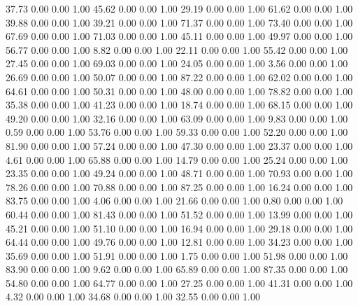    37.73   0.00   0.00   1.00
   45.62   0.00   0.00   1.00
   29.19   0.00   0.00   1.00
   61.62   0.00   0.00   1.00
   39.88   0.00   0.00   1.00
   39.21   0.00   0.00   1.00
   71.37   0.00   0.00   1.00
   73.40   0.00   0.00   1.00
   67.69   0.00   0.00   1.00
   71.03   0.00   0.00   1.00
   45.11   0.00   0.00   1.00
   49.97   0.00   0.00   1.00
   56.77   0.00   0.00   1.00
    8.82   0.00   0.00   1.00
   22.11   0.00   0.00   1.00
   55.42   0.00   0.00   1.00
   27.45   0.00   0.00   1.00
   69.03   0.00   0.00   1.00
   24.05   0.00   0.00   1.00
    3.56   0.00   0.00   1.00
   26.69   0.00   0.00   1.00
   50.07   0.00   0.00   1.00
   87.22   0.00   0.00   1.00
   62.02   0.00   0.00   1.00
   64.61   0.00   0.00   1.00
   50.31   0.00   0.00   1.00
   48.00   0.00   0.00   1.00
   78.82   0.00   0.00   1.00
   35.38   0.00   0.00   1.00
   41.23   0.00   0.00   1.00
   18.74   0.00   0.00   1.00
   68.15   0.00   0.00   1.00
   49.20   0.00   0.00   1.00
   32.16   0.00   0.00   1.00
   63.09   0.00   0.00   1.00
    9.83   0.00   0.00   1.00
    0.59   0.00   0.00   1.00
   53.76   0.00   0.00   1.00
   59.33   0.00   0.00   1.00
   52.20   0.00   0.00   1.00
   81.90   0.00   0.00   1.00
   57.24   0.00   0.00   1.00
   47.30   0.00   0.00   1.00
   23.37   0.00   0.00   1.00
    4.61   0.00   0.00   1.00
   65.88   0.00   0.00   1.00
   14.79   0.00   0.00   1.00
   25.24   0.00   0.00   1.00
   23.35   0.00   0.00   1.00
   49.24   0.00   0.00   1.00
   48.71   0.00   0.00   1.00
   70.93   0.00   0.00   1.00
   78.26   0.00   0.00   1.00
   70.88   0.00   0.00   1.00
   87.25   0.00   0.00   1.00
   16.24   0.00   0.00   1.00
   83.75   0.00   0.00   1.00
    4.06   0.00   0.00   1.00
   21.66   0.00   0.00   1.00
    0.80   0.00   0.00   1.00
   60.44   0.00   0.00   1.00
   81.43   0.00   0.00   1.00
   51.52   0.00   0.00   1.00
   13.99   0.00   0.00   1.00
   45.21   0.00   0.00   1.00
   51.10   0.00   0.00   1.00
   16.94   0.00   0.00   1.00
   29.18   0.00   0.00   1.00
   64.44   0.00   0.00   1.00
   49.76   0.00   0.00   1.00
   12.81   0.00   0.00   1.00
   34.23   0.00   0.00   1.00
   35.69   0.00   0.00   1.00
   51.91   0.00   0.00   1.00
    1.75   0.00   0.00   1.00
   51.98   0.00   0.00   1.00
   83.90   0.00   0.00   1.00
    9.62   0.00   0.00   1.00
   65.89   0.00   0.00   1.00
   87.35   0.00   0.00   1.00
   54.80   0.00   0.00   1.00
   64.77   0.00   0.00   1.00
   27.25   0.00   0.00   1.00
   41.31   0.00   0.00   1.00
    4.32   0.00   0.00   1.00
   34.68   0.00   0.00   1.00
   32.55   0.00   0.00   1.00
